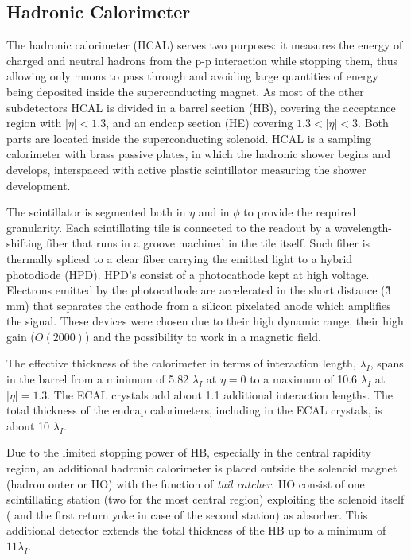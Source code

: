 \subsection{Hadronic Calorimeter}

The hadronic calorimeter (HCAL) serves two purposes: it measures the energy of charged and neutral hadrons from the p-p interaction while stopping them, thus allowing only muons to pass through and avoiding large quantities of energy being deposited inside the superconducting magnet. As most of the other subdetectors HCAL is divided in a barrel section (HB), covering the acceptance region with $|\eta| < 1.3$, and an endcap section (HE) covering $1.3 < |\eta| < 3$. Both parts are located inside the superconducting solenoid. HCAL is a sampling calorimeter with brass passive plates, in which the hadronic shower begins and develops, interspaced with active plastic scintillator measuring  the shower development. 

The scintillator is segmented both in $\eta$ and in $\phi$ to provide the required granularity. Each scintillating tile is connected to the readout by a wavelength-shifting fiber that runs in a groove machined in the tile itself. Such fiber is thermally spliced to a clear fiber carrying the emitted light to a hybrid photodiode (HPD). HPD's consist of a photocathode kept at high voltage. Electrons emitted by the photocathode are accelerated in the short distance (\~3 mm) that separates the cathode from a silicon pixelated anode which amplifies the signal. These devices were chosen due to their high dynamic range, their high gain ($O(2000)$) and the possibility to work in a magnetic field.

The effective thickness of the calorimeter in terms of interaction length, $\lambda_I$, spans in the barrel from a minimum of 5.82 $\lambda_I$ at $\eta=0$ to a maximum of 10.6 $\lambda_I$ at $|\eta| = 1.3$. The ECAL crystals add about 1.1 additional interaction lengths. The total thickness of the endcap calorimeters, including in the ECAL crystals, is about 10 $\lambda_I$.

Due to the limited stopping power of HB, especially in the central rapidity region, an additional hadronic calorimeter is placed outside the solenoid magnet (hadron outer or HO) with the function of \emph{tail catcher}. HO consist of one scintillating station (two for the most central region) exploiting the solenoid itself ( and the first return yoke in case of the second station) as absorber. This additional detector extends the total thickness of the HB up to a minimum of $11 \lambda_I$.


